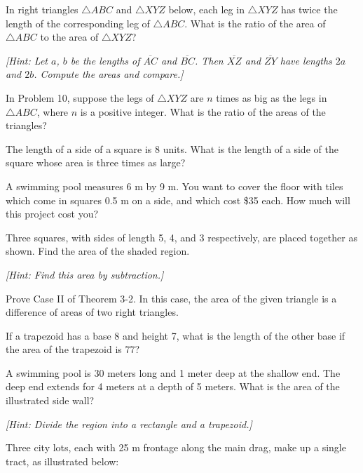 \documentclass[12pt]{book} %
\begin{document}
\setcounter{Exercise}{9}
\begin{ExerciseList}
\Exercise In right triangles $\triangle ABC$ and $\triangle XYZ$ below, each leg in $\triangle XYZ$ has twice the length of the corresponding leg of $\triangle ABC$. What is the ratio of the area of $\triangle ABC$ to the area of $\triangle XYZ$?


\textit{[Hint: Let $a$, $b$ be the lengths of $\overline{AC}$ and $\overline{BC}$. Then $\overline{XZ}$ and $\overline{ZY}$ have lengths $2a$ and $2b$. Compute the areas and compare.]}

\Exercise In Problem 10, suppose the legs of $\triangle XYZ$ are $n$ times as big as the legs in $\triangle ABC$, where $n$ is a positive integer. What is the ratio of the areas of the triangles?

\Exercise The length of a side of a square is 8 units. What is the length of a side of the square whose area is three times as large?

\Exercise A swimming pool measures 6 m by 9 m. You want to cover the floor with tiles which come in squares 0.5 m on a side, and which cost \$35 each. How much will this project cost you?

\Exercise Three squares, with sides of length 5, 4, and 3 respectively, are placed together as shown. Find the area of the shaded region.


\textit{[Hint: Find this area by subtraction.]}

\Exercise Prove Case II of Theorem 3-2. In this case, the area of the given triangle is a difference of areas of two right triangles.

\Exercise If a trapezoid has a base 8 and height 7, what is the length of the other base if the area of the trapezoid is 77?

\Exercise A swimming pool is 30 meters long and 1 meter deep at the shallow end. The deep end extends for 4 meters at a depth of 5 meters. What is the area of the illustrated side wall?


\textit{[Hint: Divide the region into a rectangle and a trapezoid.]}

\Exercise Three city lots, each with 25 m frontage along the main drag, make up a single tract, as illustrated below:



\end{ExerciseList}
\end{document}
